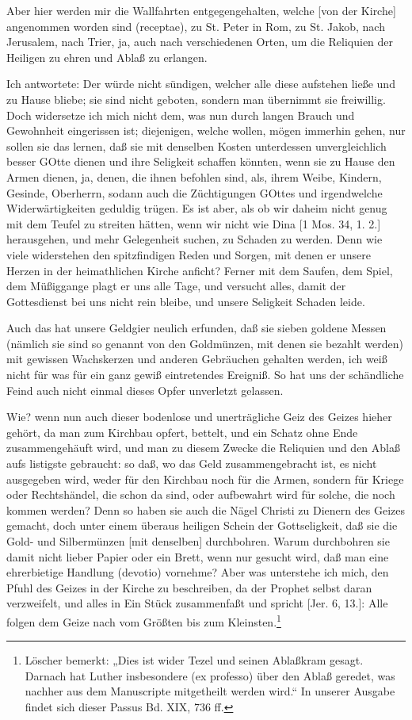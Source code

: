 Aber hier werden mir die Wallfahrten entgegengehalten, welche [von der Kirche] angenommen worden sind (receptae), zu St. Peter in Rom, zu St. Jakob, nach Jerusalem, nach Trier, ja, auch nach verschiedenen Orten, um die Reliquien der Heiligen zu ehren und Ablaß zu erlangen.

Ich antwortete: Der würde nicht sündigen, welcher alle diese aufstehen ließe und zu Hause bliebe; sie sind nicht geboten, sondern man übernimmt sie freiwillig. Doch widersetze ich mich nicht dem, was nun durch langen Brauch und Gewohnheit eingerissen ist; diejenigen, welche wollen, mögen immerhin gehen, nur sollen sie das lernen, daß sie mit denselben Kosten unterdessen unvergleichlich besser GOtte dienen und ihre Seligkeit schaffen könnten, wenn sie zu Hause den Armen dienen, ja, denen, die ihnen befohlen sind, als, ihrem Weibe, Kindern, Gesinde, Oberherrn, sodann auch die Züchtigungen GOttes und irgendwelche Widerwärtigkeiten geduldig trügen. Es ist aber, als ob wir daheim nicht genug mit dem Teufel zu streiten hätten, wenn wir nicht wie Dina [1 Mos. 34, 1. 2.] herausgehen, und mehr Gelegenheit suchen, zu Schaden zu werden. Denn wie viele widerstehen den spitzfindigen Reden und Sorgen, mit denen er unsere Herzen in der heimathlichen Kirche anficht? Ferner mit dem Saufen, dem Spiel, dem Müßiggange plagt er uns alle Tage, und versucht alles, damit der Gottesdienst bei uns nicht rein bleibe, und unsere Seligkeit Schaden leide.

Auch das hat unsere Geldgier neulich erfunden, daß sie sieben goldene Messen (nämlich sie sind so genannt von den Goldmünzen, mit denen sie
bezahlt werden) mit gewissen Wachskerzen und anderen Gebräuchen gehalten werden, ich weiß nicht für was für ein ganz gewiß eintretendes Ereigniß. So hat uns der schändliche Feind auch nicht einmal dieses Opfer unverletzt gelassen.

Wie? wenn nun auch dieser bodenlose und unerträgliche Geiz des Geizes hieher gehört, da man zum Kirchbau opfert, bettelt, und ein Schatz ohne Ende zusammengehäuft wird, und man zu diesem Zwecke die Reliquien und den Ablaß aufs listigste gebraucht: so daß, wo das Geld zusammengebracht ist, es nicht ausgegeben wird, weder für den Kirchbau noch für die Armen, sondern für Kriege oder Rechtshändel, die schon da sind, oder aufbewahrt wird für solche, die noch kommen werden? Denn so haben sie auch die Nägel Christi zu Dienern des Geizes gemacht, doch unter einem überaus heiligen Schein der Gottseligkeit, daß sie die Gold- und Silbermünzen [mit denselben] durchbohren. Warum durchbohren sie damit nicht lieber Papier oder ein Brett, wenn nur gesucht wird, daß man eine ehrerbietige Handlung (devotio) vornehme? Aber was unterstehe ich mich, den Pfuhl des Geizes in der Kirche zu beschreiben, da der Prophet selbst daran verzweifelt, und alles in Ein Stück zusammenfaßt und spricht [Jer. 6, 13.]: Alle folgen dem Geize nach vom Größten bis zum Kleinsten.\footnote{Löscher bemerkt: „Dies ist wider Tezel und seinen Ablaßkram gesagt. Darnach hat Luther insbesondere (ex professo) über den Ablaß geredet, was nachher aus dem Manuscripte mitgetheilt werden wird.“ In unserer Ausgabe findet sich dieser Passus Bd. XIX, 736 ff.}

